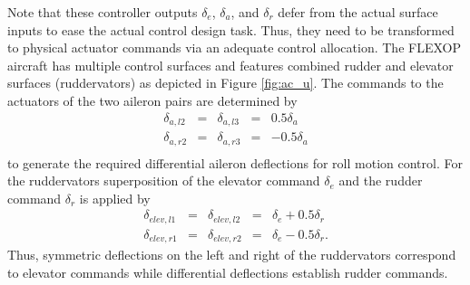 \documentclass[aerospace,article,submit,moreauthors,pdftex,10pt,a4paper]{Definitions/mdpi}
\begin{document}
Note that these controller outputs $\delta_e$, $\delta_a$, and $\delta_r$ defer from the actual surface inputs to ease the actual control design task. Thus, they need to be transformed to physical actuator commands via an adequate control allocation.
The FLEXOP aircraft has multiple control surfaces and features combined rudder and elevator surfaces (ruddervators) as depicted in Figure \ref{fig:ac_u}. The commands to the actuators of the two aileron pairs are determined by
\begin{equation}\label{eq:CAail}
\begin{array}{rclcr}
\delta_{a,l2} &=& \delta_{a,l3} &=&  0.5 \delta_{a} \\
\delta_{a,r2} &=& \delta_{a,r3} &=&  -0.5 \delta_{a} \\
\end{array}
\end{equation}
to generate the required differential aileron deflections for roll motion control. For the ruddervators superposition of the elevator command $\delta_e$ and the rudder command $\delta_r$ is applied by
\begin{equation}\label{eq:CAelev}
\begin{array}{rclcl}
\delta_{elev,l1} &=& \delta_{elev,l2} &=&  \delta_e + 0.5 \delta_r \\
\delta_{elev,r1} &=& \delta_{elev,r2}  &=& \delta_e - 0.5 \delta_r.
\end{array}
\end{equation}
Thus, symmetric deflections on the left and right of the ruddervators correspond to elevator commands while differential deflections establish rudder commands.
\end{document}
